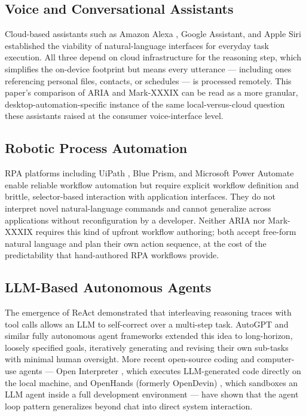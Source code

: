 \documentclass[conference]{IEEEtran}
\begin{document}
\subsection{Voice and Conversational Assistants}

Cloud-based assistants such as Amazon Alexa \cite{ref1}, Google Assistant, and Apple Siri established the viability of natural-language interfaces for everyday task execution. All three depend on cloud infrastructure for the reasoning step, which simplifies the on-device footprint but means every utterance --- including ones referencing personal files, contacts, or schedules --- is processed remotely. This paper's comparison of ARIA and Mark-XXXIX can be read as a more granular, desktop-automation-specific instance of the same local-versus-cloud question these assistants raised at the consumer voice-interface level.

\subsection{Robotic Process Automation}

RPA platforms including UiPath \cite{ref3}, Blue Prism, and Microsoft Power Automate enable reliable workflow automation but require explicit workflow definition and brittle, selector-based interaction with application interfaces. They do not interpret novel natural-language commands and cannot generalize across applications without reconfiguration by a developer. Neither ARIA nor Mark-XXXIX requires this kind of upfront workflow authoring; both accept free-form natural language and plan their own action sequence, at the cost of the predictability that hand-authored RPA workflows provide.

\subsection{LLM-Based Autonomous Agents}

The emergence of ReAct \cite{ref4} demonstrated that interleaving reasoning traces with tool calls allows an LLM to self-correct over a multi-step task. AutoGPT \cite{ref6} and similar fully autonomous agent frameworks extended this idea to long-horizon, loosely specified goals, iteratively generating and revising their own sub-tasks with minimal human oversight. More recent open-source coding and computer-use agents --- Open Interpreter \cite{ref7}, which executes LLM-generated code directly on the local machine, and OpenHands (formerly OpenDevin) \cite{ref8}, which sandboxes an LLM agent inside a full development environment --- have shown that the agent loop pattern generalizes beyond chat into direct system interaction.
\end{document}
